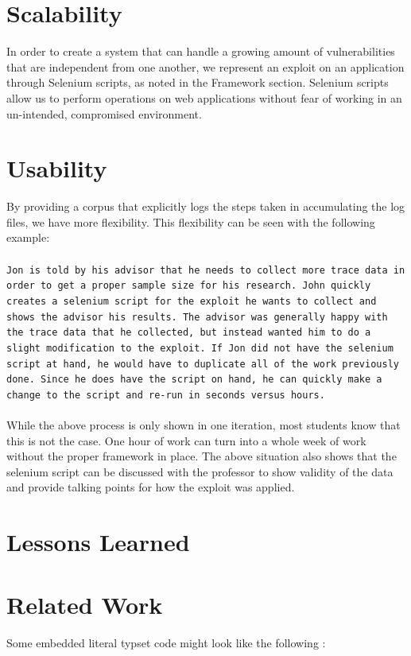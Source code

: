 \documentclass[letterpaper,twocolumn,10pt]{article}
\begin{document}
\section{Scalability}
In order to create a system that can handle a growing amount of vulnerabilities that are independent from one another, we represent an exploit on an application through  Selenium scripts, as noted in the Framework section.  Selenium scripts allow us to perform operations on web applications without fear of working in an un-intended, compromised environment. 

\section{Usability}
By providing a corpus that explicitly logs the steps taken in accumulating the log files, we have more flexibility.  This flexibility can be seen with the following example:  
\\\\
{\tt Jon is told by his advisor that he needs to collect more trace data in order to get a proper sample size for his research.  John quickly creates a selenium script for the exploit he wants to collect and shows the advisor his results.  The advisor was generally happy with the trace data that he collected, but instead wanted him to do a slight modification to the exploit.  If Jon did not have the selenium script at hand, he would have to duplicate all of the work previously done.  Since he does have the script on hand, he can quickly make a change to the script and re-run in seconds versus hours.}
\\\\
While the above process is only shown in one iteration, most students know that this is not the case.  One hour of work can turn into a whole week of work without the proper framework in place.  The above situation also shows that the selenium script can be discussed with the professor to show validity of the data and provide talking points for how the exploit was applied.


\section{Lessons Learned}

\section{Related Work}

Some embedded literal typset code might 
look like the following :
\end{document}
